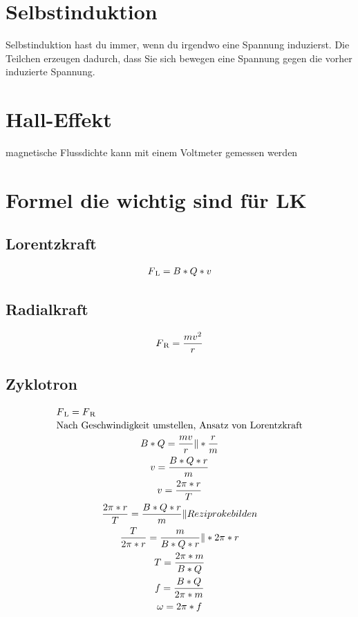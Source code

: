 \documentclass{scrartcl}
\begin{document}
    \section*{Selbstinduktion}
        Selbstinduktion hast du immer, wenn du irgendwo eine Spannung induzierst. Die Teilchen erzeugen dadurch, dass Sie sich bewegen eine Spannung gegen die vorher induzierte Spannung.
    \section*{Hall-Effekt}
        magnetische Flussdichte kann mit einem Voltmeter gemessen werden
    \section*{Formel die wichtig sind für LK}
        \subsection*{Lorentzkraft}
            \begin{equation}
                \begin{multlined}
                    F\textsubscript{L}=B*Q*v
                \end{multlined}
            \end{equation}
        \subsection*{Radialkraft}
            \begin{equation}
                \begin{multlined}
                    F\textsubscript{R}=\frac{mv^2}{r}
                \end{multlined}
            \end{equation}
        \subsection*{Zyklotron}
            \begin{equation}
                \begin{multlined}
                    F\textsubscript{L}=F\textsubscript{R} \\
                    \text{Nach Geschwindigkeit umstellen, Ansatz von Lorentzkraft} \\
                    B*Q = \frac{mv}{r} \| * \frac{r}{m} \\
                    v=\frac{B*Q*r}{m} \\
                    v=\frac{2\pi*r}{T} \\
                    \frac{2\pi*r}{T}=\frac{B*Q*r}{m} \| Reziproke bilden \\
                    \frac{T}{2\pi*r}=\frac{m}{B*Q*r} \| *2\pi*r \\
                    T=\frac{2\pi*m}{B*Q} \\
                    f=\frac{B*Q}{2\pi*m} \\
                    \omega=2\pi*f \\
                \end{multlined}
            \end{equation}
\end{document}
